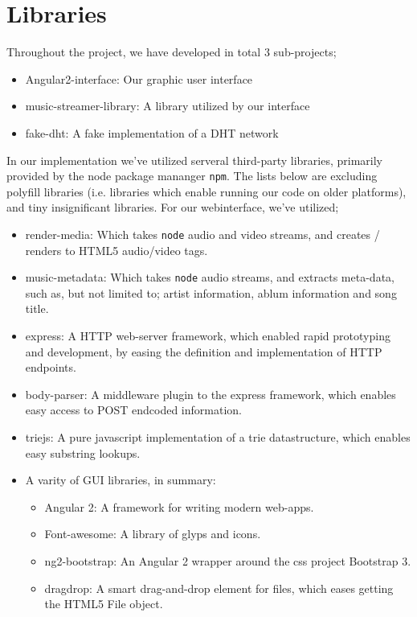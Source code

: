 \section{Libraries}
\label{sec:libraries}
Throughout the project, we have developed in total 3 sub-projects;
\begin{itemize}
\item Angular2-interface: Our graphic user interface
\item music-streamer-library: A library utilized by our interface
\item fake-dht: A fake implementation of a DHT network
\end{itemize}
In our implementation we've utilized serveral third-party libraries, primarily
provided by the node package mananger \verb|npm|. The lists below are excluding
polyfill libraries (i.e. libraries which enable running our code on older
platforms), and tiny insignificant libraries.
\newline\newline
For our webinterface, we've utilized;
\begin{itemize}
\item render-media: Which takes \verb|node| audio and video streams, and
        creates / renders to HTML5 audio/video tags.
\item music-metadata: Which takes \verb|node| audio streams, and extracts
        meta-data, such as, but not limited to; artist information, ablum 
        information and song title.
\item express: A HTTP web-server framework, which enabled rapid prototyping and
        development, by easing the definition and implementation of HTTP endpoints.
\item body-parser: A middleware plugin to the express framework, which enables 
        easy access to POST endcoded information.
\item triejs: A pure javascript implementation of a trie datastructure, which 
        enables easy substring lookups.
\item A varity of GUI libraries, in summary:
\begin{itemize}
\item Angular 2: A framework for writing modern web-apps.
\item Font-awesome: A library of glyps and icons.
\item ng2-bootstrap: An Angular 2 wrapper around the css project Bootstrap 3.
\item dragdrop: A smart drag-and-drop element for files, which eases getting
        the HTML5 File object.
\end{itemize}
\end{itemize}
